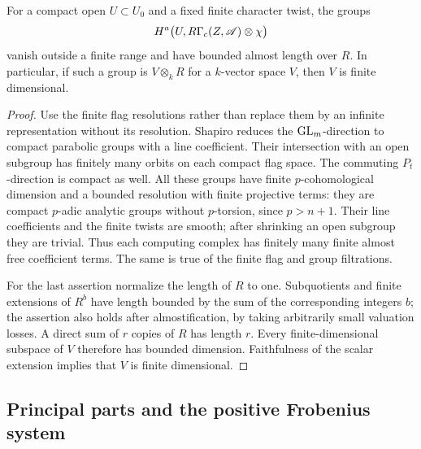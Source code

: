 \begin{corollary}\label{support:finite-invariants}
For a compact open $U\subset U_0$ and a fixed finite character
twist, the groups
\[
 H^a\bigl(U,R\Gamma_c(Z,\mathscr A)\otimes\chi\bigr)
\]
vanish outside a finite range and have bounded almost length over
$R$.  In particular, if such a group is $V\otimes_kR$ for a
$k$-vector space $V$, then $V$ is finite dimensional.
\end{corollary}

\begin{proof}
Use the finite flag resolutions rather than replace them by an
infinite representation without its resolution.  Shapiro reduces
the $\operatorname{GL}_m$-direction to compact parabolic groups with a line
coefficient.  Their intersection with an open subgroup has
finitely many orbits on each compact flag space.  The commuting
$P_t$-direction is compact as well.  All these groups have finite
$p$-cohomological dimension and a bounded resolution with finite
projective terms: they are compact $p$-adic analytic groups
without $p$-torsion, since $p>n+1$.
Their line coefficients and the finite twists are smooth; after
shrinking an open subgroup they are trivial.  Thus each computing
complex has finitely many finite almost free coefficient terms.
The same is true of the finite flag and group filtrations.

For the last assertion normalize the length of $R$ to one.
Subquotients and finite extensions of $R^b$ have length bounded
by the sum of the corresponding integers $b$; the assertion
also holds after almostification, by taking arbitrarily small
valuation losses.  A direct sum of $r$ copies of $R$ has length
$r$.  Every finite-dimensional subspace of $V$ therefore has
bounded dimension.  Faithfulness of the scalar extension implies
that $V$ is finite dimensional.
\end{proof}

\subsection{Principal parts and the positive Frobenius system}

